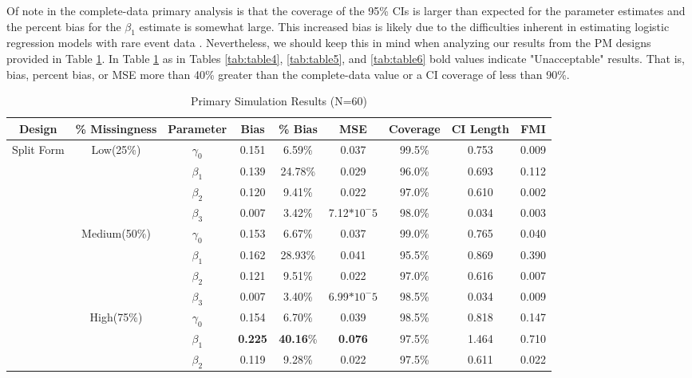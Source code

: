 \documentclass{svjour3}                     %
\begin{document}
Of note in the complete-data primary analysis is that the coverage of the 95\% CIs is larger than expected for the parameter estimates and the percent bias for the $\beta_1$ estimate is somewhat large. This increased bias is likely due to the difficulties inherent in estimating logistic regression models with rare event data \citep{king2001logistic}. Nevertheless, we should keep this in mind when analyzing our results from the PM designs provided in Table \ref{tab:table3}. In Table \ref{tab:table3} as in Tables \ref{tab:table4}, \ref{tab:table5}, and \ref{tab:table6} bold values indicate "Unacceptable" results. That is, bias, percent bias, or MSE more than 40\% greater than the complete-data value or a CI coverage of less than 90\%.

\begin{table}[p]
	\centering
	\caption{Primary Simulation Results (N=60)}
	\setlength{\tabcolsep}{0.1cm}
	\label{tab:table3}
	\hspace*{-1cm}
	\begin{tabular}{c|c|c|cccccc}
		\toprule
		Design & \% Missingness & Parameter & Bias & \% Bias & MSE & Coverage & CI Length & FMI \\
		\midrule
		\multirow{12}{*}{Split Form}
		& \multirow{4}{*}{Low(25\%)}
		& $\gamma_0$ & 0.151 & 6.59\% & 0.037 & 99.5\% & 0.753 & 0.009 \\
		&& $\beta_1$ & 0.139 & 24.78\% & 0.029 & 96.0\% & 0.693 & 0.112 \\
		&& $\beta_2$ & 0.120 & 9.41\% & 0.022 & 97.0\% & 0.610 & 0.002 \\
		&& $\beta_3$ & 0.007 & 3.42\% & 7.12$*10^-5$ & 98.0\% & 0.034 & 0.003 \\ \cline{2-9} \noalign{\smallskip}
		&\multirow{4}{*}{Medium(50\%)}
		& $\gamma_0$ & 0.153 & 6.67\% & 0.037 & 99.0\% & 0.765 & 0.040 \\
		&& $\beta_1$ & 0.162 & 28.93\% & 0.041 & 95.5\% & 0.869 & 0.390 \\
		&& $\beta_2$ & 0.121 & 9.51\% & 0.022 & 97.0\% & 0.616 & 0.007 \\
		&& $\beta_3$ & 0.007 & 3.40\% & 6.99$*10^-5$ & 98.5\% & 0.034 & 0.009 \\ \cline{2-9} \noalign{\smallskip}
		& \multirow{4}{*}{High(75\%)}
		& $\gamma_0$ & 0.154 & 6.70\% & 0.039 & 98.5\% & 0.818 & 0.147 \\
		&& $\beta_1$ & \textbf{0.225} & \textbf{40.16}\% & \textbf{0.076} & 97.5\% & 1.464 & 0.710 \\
		&& $\beta_2$ & 0.119 & 9.28\% & 0.022 & 97.5\% & 0.611 & 0.022 \\

\end{tabular}
\end{table}
\end{document}
